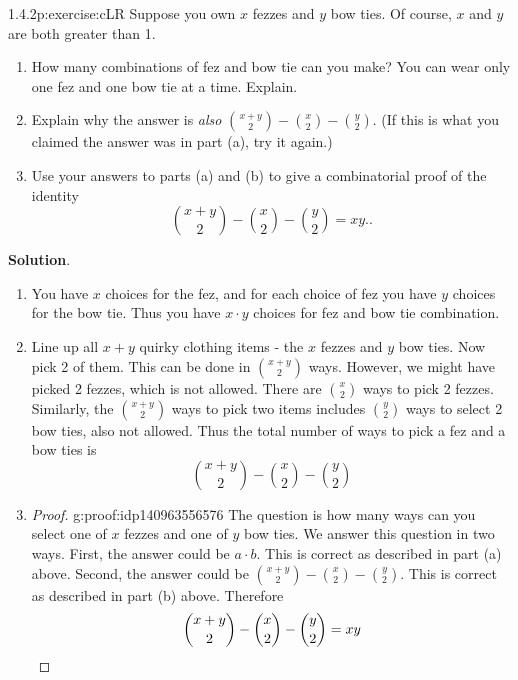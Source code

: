 \documentclass[twoside,11pt,]{book}
\newcommand{\blocktitlefont}{\relax}
\newcommand{\qedhere}{\relax}
\numberwithin{equation}{chapter}
\begin{document}
\begin{divisionsolution}{1.4.2}{}{p:exercise:cLR}%
Suppose you own \(x\) fezzes and \(y\) bow ties. Of course, \(x\) and \(y\) are both greater than 1.%
\begin{enumerate}[label=(\alph*)]
\item{}How many combinations of fez and bow tie can you make? You can wear only one fez and one bow tie at a time. Explain.%
\item{}Explain why the answer is \emph{also} \({x+y \choose 2} - {x \choose 2} - {y \choose 2}\). (If this is what you claimed the answer was in part (a), try it again.)%
\item{}Use your answers to parts (a) and (b) to give a combinatorial proof of the identity%
\begin{equation*}
{x+y \choose 2} - {x \choose 2} - {y \choose 2} = xy.\text{.}
\end{equation*}
%
\end{enumerate}
%
\par\smallskip%
\noindent\textbf{\blocktitlefont Solution}.\quad{}%
\begin{enumerate}[label=(\alph*)]
\item{}You have \(x\) choices for the fez, and for each choice of fez you have \(y\) choices for the bow tie. Thus you have \(x \cdot y\) choices for fez and bow tie combination.%
\item{}Line up all \(x+y\) quirky clothing items - the \(x\) fezzes and \(y\) bow ties. Now pick 2 of them. This can be done in \({x+y \choose 2}\) ways. However, we might have picked 2 fezzes, which is not allowed. There are \({x \choose 2}\) ways to pick 2 fezzes. Similarly, the \({x+y \choose 2}\) ways to pick two items includes \({y \choose 2}\) ways to select 2 bow ties, also not allowed. Thus the total number of ways to pick a fez and a bow ties is%
\begin{equation*}
{x+y \choose 2} - {x \choose 2} - {y \choose 2}
\end{equation*}
%
\item{}\begin{proof}{}{g:proof:idp140963556576}
The question is how many ways can you select one of \(x\) fezzes and one of \(y\) bow ties. We answer this question in two ways. First, the answer could be \(a\cdot b\). This is correct as described in part (a) above. Second, the answer could be \({x+y \choose 2} - {x \choose 2} - {y \choose 2}\). This is correct as described in part (b) above. Therefore%
\begin{equation*}
{x+y \choose 2} - {x \choose 2} - {y \choose 2} = xy\qedhere
\end{equation*}
%
\end{proof}
%
\end{enumerate}
%
\end{divisionsolution}%
\end{document}
